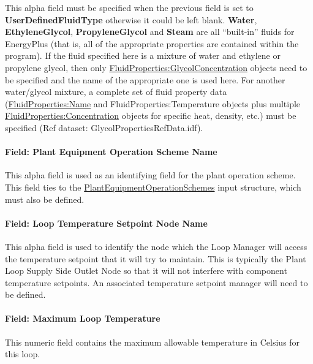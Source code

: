 This alpha field must be specified when the previous field is set to \textbf{UserDefinedFluidType} otherwise it could be left blank. \textbf{Water}, \textbf{EthyleneGlycol}, \textbf{PropyleneGlycol} and \textbf{Steam} are all ``built-in'' fluids for EnergyPlus (that is, all of the appropriate properties are contained within the program). If the fluid specified here is a mixture of water and ethylene or propylene glycol, then only \hyperref[fluidpropertiesglycolconcentration]{FluidProperties:GlycolConcentration} objects need to be specified and the name of the appropriate one is used here. For another water/glycol mixture, a complete set of fluid property data (\hyperref[fluidpropertiesname]{FluidProperties:Name} and FluidProperties:Temperature objects plus multiple \hyperref[fluidpropertiesconcentration]{FluidProperties:Concentration} objects for specific heat, density, etc.) must be specified (Ref dataset: GlycolPropertiesRefData.idf).

\paragraph{Field: Plant Equipment Operation Scheme Name}\label{field-plant-equipment-operation-scheme-name}

This alpha field is used as an identifying field for the plant operation scheme. This field ties to the \hyperref[plantequipmentoperationschemes]{PlantEquipmentOperationSchemes} input structure, which must also be defined.

\paragraph{Field: Loop Temperature Setpoint Node Name}\label{field-loop-temperature-setpoint-node-name}

This alpha field is used to identify the node which the Loop Manager will access the temperature setpoint that it will try to maintain. This is typically the Plant Loop Supply Side Outlet Node so that it will not interfere with component temperature setpoints. An associated temperature setpoint manager will need to be defined.

\paragraph{Field: Maximum Loop Temperature}\label{field-maximum-loop-temperature}

This numeric field contains the maximum allowable temperature in Celsius for this loop.


